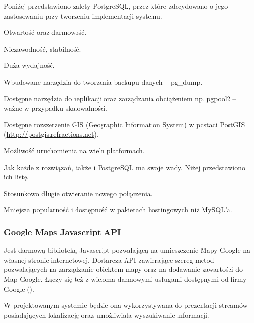 Poniżej przedstawiono zalety PostgreSQL, przez które zdecydowano o jego zastosowaniu przy tworzeniu implementacji systemu.
\begin{packed_item}
    \item{Otwartość oraz darmowość.}
    \item{Niezawodność, stabilność.}
    \item{Duża wydajność.}
    \item{Wbudowane narzędzia do tworzenia backupu danych -- pg\_dump.}
    \item{Dostępne narzędzia do replikacji oraz zarządzania obciążeniem np. pgpool2 -- ważne w przypadku skalowalności.}
    \item{Dostępne rozszerzenie GIS (Geographic Information System) w postaci PostGIS (\url{http://postgis.refractions.net}).}
    \item{Możliwość uruchomienia na wielu platformach.}
\end{packed_item}

Jak każde z rozwiązań, także i PostgreSQL ma swoje wady. Niżej przedstawiono ich listę.
\begin{packed_item}
    \item{Stosunkowo długie otwieranie nowego połączenia.}
    \item{Mniejsza popularność i dostępność w pakietach hostingowych niż MySQL'a.}
\end{packed_item}

\newpage
\subsubsection{Google Maps Javascript API}
Jest darmową biblioteką Javascript pozwalającą na umieszczenie Mapy Google na własnej stronie internetowej. Dostarcza API zawierające szereg metod pozwalających na zarządzanie obiektem mapy oraz na dodawanie zawartości do Map Google. Łączy się też z wieloma darmowymi usługami dostępnymi od firmy Google  (\cite{GoogleMapsJsAPI}).

W projektowanym systemie będzie ona wykorzystywana do prezentacji streamów posiadających lokalizację oraz umożliwiała wyszukiwanie informacji.

